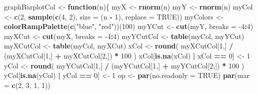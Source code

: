 \documentclass[
]{book}
\newenvironment{Shaded}{\begin{snugshade}}{\end{snugshade}}
\newcommand{\ControlFlowTok}[1]{\textcolor[rgb]{0.13,0.29,0.53}{\textbf{#1}}}
\newcommand{\DataTypeTok}[1]{\textcolor[rgb]{0.13,0.29,0.53}{#1}}
\newcommand{\DecValTok}[1]{\textcolor[rgb]{0.00,0.00,0.81}{#1}}
\newcommand{\KeywordTok}[1]{\textcolor[rgb]{0.13,0.29,0.53}{\textbf{#1}}}
\newcommand{\NormalTok}[1]{#1}
\newcommand{\OperatorTok}[1]{\textcolor[rgb]{0.81,0.36,0.00}{\textbf{#1}}}
\newcommand{\OtherTok}[1]{\textcolor[rgb]{0.56,0.35,0.01}{#1}}
\newcommand{\StringTok}[1]{\textcolor[rgb]{0.31,0.60,0.02}{#1}}
\begin{document}
\begin{Shaded}
\begin{Highlighting}[]
\NormalTok{graphBarplotCol <-}\StringTok{ }\ControlFlowTok{function}\NormalTok{(n)\{}
\NormalTok{  myX <-}\StringTok{ }\KeywordTok{rnorm}\NormalTok{(n)}
\NormalTok{  myY <-}\StringTok{ }\KeywordTok{rnorm}\NormalTok{(n)}
\NormalTok{  myCol <-}\StringTok{ }\KeywordTok{c}\NormalTok{(}\DecValTok{2}\NormalTok{, }\KeywordTok{sample}\NormalTok{(}\KeywordTok{c}\NormalTok{(}\DecValTok{4}\NormalTok{, }\DecValTok{2}\NormalTok{), }\DataTypeTok{size =}\NormalTok{ (n }\OperatorTok{-}\StringTok{ }\DecValTok{1}\NormalTok{), }\DataTypeTok{replace =} \OtherTok{TRUE}\NormalTok{))}
\NormalTok{  myColors <-}\StringTok{ }\KeywordTok{colorRampPalette}\NormalTok{(}\KeywordTok{c}\NormalTok{(}\StringTok{"blue"}\NormalTok{, }\StringTok{"red"}\NormalTok{))(}\DecValTok{100}\NormalTok{)}
\NormalTok{  myYCut <-}\StringTok{ }\KeywordTok{cut}\NormalTok{(myY, }\DataTypeTok{breaks =} \DecValTok{-4}\OperatorTok{:}\DecValTok{4}\NormalTok{)}
\NormalTok{  myXCut <-}\StringTok{ }\KeywordTok{cut}\NormalTok{(myX, }\DataTypeTok{breaks =} \DecValTok{-4}\OperatorTok{:}\DecValTok{4}\NormalTok{)}
\NormalTok{  myYCutCol <-}\StringTok{ }\KeywordTok{table}\NormalTok{(myCol, myYCut)}
\NormalTok{  myXCutCol <-}\StringTok{ }\KeywordTok{table}\NormalTok{(myCol, myXCut)}
\NormalTok{  xCol <-}\StringTok{ }\KeywordTok{round}\NormalTok{(}
\NormalTok{    myXCutCol[}\DecValTok{1}\NormalTok{,] }\OperatorTok{/}\StringTok{ }\NormalTok{(myXCutCol[}\DecValTok{1}\NormalTok{,] }\OperatorTok{+}\StringTok{ }\NormalTok{myXCutCol[}\DecValTok{2}\NormalTok{,]) }\OperatorTok{*}\StringTok{ }\DecValTok{100}
\NormalTok{  )}
\NormalTok{  xCol[}\KeywordTok{is.na}\NormalTok{(xCol) }\OperatorTok{|}\StringTok{ }\NormalTok{xCol }\OperatorTok{==}\StringTok{ }\DecValTok{0}\NormalTok{] <-}\StringTok{ }\DecValTok{1}
\NormalTok{  yCol <-}\StringTok{ }\KeywordTok{round}\NormalTok{(}
\NormalTok{    myYCutCol[}\DecValTok{1}\NormalTok{,] }\OperatorTok{/}\StringTok{ }\NormalTok{(myYCutCol[}\DecValTok{1}\NormalTok{,] }\OperatorTok{+}\StringTok{ }\NormalTok{myYCutCol[}\DecValTok{2}\NormalTok{,]) }\OperatorTok{*}\StringTok{ }\DecValTok{100}
\NormalTok{  )}
\NormalTok{  yCol[}\KeywordTok{is.na}\NormalTok{(yCol) }\OperatorTok{|}\StringTok{ }\NormalTok{yCol }\OperatorTok{==}\StringTok{ }\DecValTok{0}\NormalTok{] <-}\StringTok{ }\DecValTok{1}
\NormalTok{  op <-}\StringTok{ }\KeywordTok{par}\NormalTok{(}\DataTypeTok{no.readonly =} \OtherTok{TRUE}\NormalTok{)}
  \KeywordTok{par}\NormalTok{(}\DataTypeTok{mar =} \KeywordTok{c}\NormalTok{(}\DecValTok{2}\NormalTok{, }\DecValTok{3}\NormalTok{, }\DecValTok{1}\NormalTok{, }\DecValTok{1}\NormalTok{))}

\end{Highlighting}
\end{Shaded}
\end{document}
